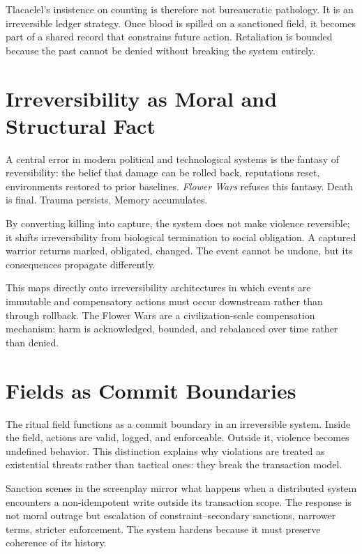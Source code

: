 \documentclass[12pt]{article}
\begin{document}
Tlacaelel's insistence on counting is therefore not bureaucratic pathology. It is an irreversible ledger strategy. Once blood is spilled on a sanctioned field, it becomes part of a shared record that constrains future action. Retaliation is bounded because the past cannot be denied without breaking the system entirely.

\section*{Irreversibility as Moral and Structural Fact}

A central error in modern political and technological systems is the fantasy of reversibility: the belief that damage can be rolled back, reputations reset, environments restored to prior baselines. \textit{Flower Wars} refuses this fantasy. Death is final. Trauma persists. Memory accumulates.

By converting killing into capture, the system does not make violence reversible; it shifts irreversibility from biological termination to social obligation. A captured warrior returns marked, obligated, changed. The event cannot be undone, but its consequences propagate differently.

This maps directly onto irreversibility architectures in which events are immutable and compensatory actions must occur downstream rather than through rollback. The Flower Wars are a civilization-scale compensation mechanism: harm is acknowledged, bounded, and rebalanced over time rather than denied.

\section*{Fields as Commit Boundaries}

The ritual field functions as a commit boundary in an irreversible system. Inside the field, actions are valid, logged, and enforceable. Outside it, violence becomes undefined behavior. This distinction explains why violations are treated as existential threats rather than tactical ones: they break the transaction model.

Sanction scenes in the screenplay mirror what happens when a distributed system encounters a non-idempotent write outside its transaction scope. The response is not moral outrage but escalation of constraint--secondary sanctions, narrower terms, stricter enforcement. The system hardens because it must preserve coherence of its history.
\end{document}
